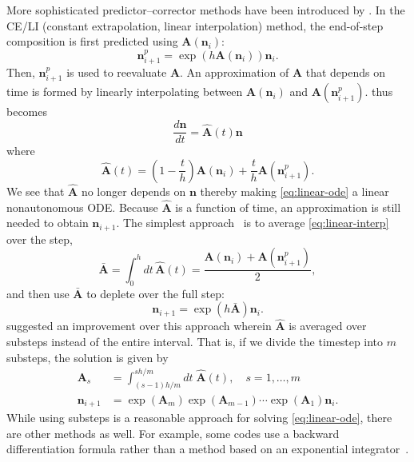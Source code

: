 \documentclass[3p,authoryear]{elsarticle}
\newcommand{\vect}[1]{\mathbf{#1}} %
\begin{document}
More sophisticated predictor--corrector methods have been introduced by
\citet{isotalo2011ane2,isotalo2011ane3}. In the CE/LI (constant extrapolation,
linear interpolation) method, the end-of-step composition is first predicted
using $\vect{A}(\vect{n}_i)$:
\begin{equation}
  \vect{n}_{i+1}^p = \exp \left( h\vect{A}(\vect{n}_i) \right) \vect{n}_i.
\end{equation}
Then, $\vect{n}_{i+1}^p$ is used to reevaluate $\vect{A}$. An approximation of
$\vect{A}$ that depends on time is formed by linearly interpolating between
$\vect{A}(\vect{n}_i)$ and $\vect{A}\left(\vect{n}_{i+1}^p\right)$.
 thus becomes
\begin{equation}
  \label{eq:linear-ode}
  \frac{d\vect{n}}{dt} = \hat{\vect{A}}(t) \vect{n}
\end{equation}
where
\begin{equation}
  \label{eq:linear-interp}
  \hat{\vect{A}}(t) = \left ( 1 - \frac{t}{h} \right) \vect{A}(\vect{n}_i) +
  \frac{t}{h} \vect{A}\left(\vect{n}_{i+1}^p \right).
\end{equation}
We see that $\hat{\vect{A}}$ no longer depends on $\vect{n}$ thereby making
\cref{eq:linear-ode} a linear nonautonomous ODE. Because $\hat{\vect{A}}$ is a
function of time, an approximation is still needed to obtain $\vect{n}_{i+1}$.
The simplest approach~\citep{isotalo2011ane2} is to average
\cref{eq:linear-interp} over the step,
\begin{equation}
  \bar{\vect{A}} = \int_0^h dt \, \hat{\vect{A}}(t) = \frac{\vect{A}(\vect{n}_i)
  + \vect{A}(\vect{n}_{i+1}^p)}{2},
\end{equation}
and then use $\bar{\vect{A}}$ to deplete over the full step:
\begin{equation}
  \vect{n}_{i+1} = \exp \left ( h \bar{\vect{A}} \right ) \vect{n}_i.
\end{equation}
\citet{isotalo2011ane3} suggested an improvement over this approach wherein
$\hat{\vect{A}}$ is averaged over substeps instead of the entire interval. That
is, if we divide the timestep into $m$ substeps, the solution is given by
\begin{equation}
  \begin{split}
    \label{eq:celi-substeps}
    \vect{A}_s &= \int_{(s-1)h/m}^{sh/m} dt \; \hat{\vect{A}}(t), \quad s=1,\dots,m \\
    \vect{n}_{i+1} &= \exp\left(\vect{A}_m \right) \exp \left(\vect{A}_{m-1}\right)
    \cdots \exp\left(\vect{A}_1\right) \vect{n}_i.
  \end{split}
\end{equation}
While using substeps is a reasonable approach for solving \cref{eq:linear-ode},
there are other methods as well. For example, some codes use a backward
differentiation formula rather than a method based on an exponential
integrator~\citep{carpenter2009mc,hykes2017mc,sublet2017nds}.
\end{document}
